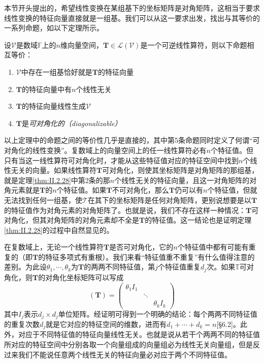 \documentclass[main.tex]{subfiles}
\begin{document}
本节开头提出的，希望线性变换在某组基下的坐标矩阵是对角矩阵，这相当于要求线性变换的特征向量直接就是一组基。我们可以从这一要求出发，找出与其等价的一系列命题，如以下定理所示。

\begin{theorem}\label{thm:II.2.28}
    设$\mathcal{V}$是数域$\mathbb{F}$上的$n$维向量空间，$\mathbf{T}\in\mathcal{L}\left(\mathcal{V}\right)$是一个可逆线性算符，则以下命题相互等价：
    \begin{enumerate}
        \item $\mathcal{V}$中存在一组基恰好就是$\mathbf{T}$的特征向量
        \item $\mathbf{T}$的特征向量中有$n$个线性无关
        \item $\mathbf{T}$的特征向量线性生成$\mathcal{V}$
        \item $\mathbf{T}$是\emph{可对角化的（diagonalizable）}
    \end{enumerate}
\end{theorem}

以上定理中的命题之间的等价性几乎是直接的\cite[\S5.2 矩阵可对角化的条件]{周胜林2012线性代数}，其中第5条命题同时定义了何谓“可对角化的线性变换”。复数域上的向量空间上的任一线性算符必有$n$个特征值。但只有当这一线性算符可对角化时，才能从这些特征值对应的特征空间中找到$n$个线性无关的向量。如果线性算符$\mathbf{T}$可对角化，则使其坐标矩阵是对角矩阵的那组基，就是定理\ref{thm:II.2.28}中第2条的那$n$个线性无关的特征向量，且这一对角矩阵的对角元素就是$\mathbf{T}$的$n$个特征值。如果$\mathbf{T}$不可对角化，那么$\mathbf{T}$仍可以有$n$个特征值，但就无法找到任何一组基，使$\mathcal{T}$在其下的坐标矩阵是任何对角矩阵，更别说想要是以$\mathbf{T}$的特征值作为对角元素的对角矩阵了。也就是说，我们不存在这样一种情况：$\mathbf{T}$可对角化，但其对角矩阵的对角元素却不全是$\mathbf{T}$的特征值。这一结论也是证明定理\ref{thm:II.2.28}的过程中自然显见的。

在复数域上，无论一个线性算符$\mathbf{T}$是否可对角化，它的$n$个特征值中都有可能有重复的（即$\mathbf{T}$的特征多项式有重根）。我们来看“特征值重不重复”有什么值得注意的差别。为此设$\theta_1,\cdots,\theta_k$为$\mathbf{T}$的两两不同特征值，第$j$个特征值重复$d_j$次。如果$\mathbb{T}$可对角化，则$\mathbf{T}$的对角化坐标矩阵可以写成
\[\left(\mathbf{T}\right)=\left(\begin{array}{ccc}\theta_1I_1&&\\&\ddots&\\&&\theta_kI_k\end{array}\right)\]
其中$I_j$表示$d_j\times d_j$单位矩阵。经证明可得到一个明确的结论：每个两两不同特征值的重复次数$d_j$就是它对应的特征空间的维数，进而有$d_1+\cdots+d_k=n$[\S 6.2]\cite{Hoffman1971}。此外，对应于不同特征值的特征向量线性无关。也就是说从若干个两两不同的特征值所对应的特征空间中分别各取一个向量组成的向量组必为线性无关向量组\cite[\S 5.1 性质1.4]{周胜林2012线性代数}，但是反过来我们不能说任意两个线性无关的特征向量必对应于两个不同特征值。
\end{document}
